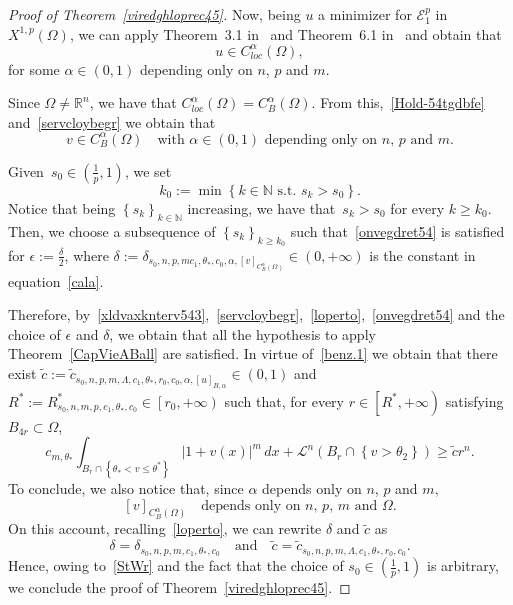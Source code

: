 \documentclass[12pt]{article}
\newcommand{\R}{\mathbb{R}}
\newcommand{\N}{\mathbb{N}}
\numberwithin{equation}{section}
\renewcommand{\leq}{\leqslant}
\renewcommand{\geq}{\geqslant}
\begin{document}
\begin{proof}[Proof of Theorem~\ref{viredghloprec45}]
Now, being $u$ a minimizer for $\mathcal{E}_1^p$  in $X^{1,p}(\Omega)$, we can apply Theorem~3.1 in~\cite{MR0666107} and Theorem~6.1 in~\cite{MR0244627} and obtain that
\begin{equation}\label{Hold-54tgdbfe}
u\in C_{\textit{loc}}^\alpha(\Omega),
\end{equation}
for some $\alpha\in (0,1)$ depending only on $n$, $p$ and $m$.

Since $\Omega\neq \R^n$, we have that $C_{\textit{loc}}^\alpha(\Omega)=C_B^\alpha(\Omega)$. From this,~\eqref{Hold-54tgdbfe} and~\eqref{servcloybegr} we obtain that 
\begin{equation}\label{loperto}
v\in C_B^\alpha(\Omega)\quad\mbox{with $\alpha\in(0,1)$ depending only on $n$, $p$ and $m$.} 
\end{equation}

Given~$s_0\in\left(\frac{1}{p},1\right)$, we set 
\begin{equation*}
k_0:=\min \left\lbrace k\in\N\mbox{  s.t.  } s_k>s_0 \right\rbrace. 
\end{equation*}
Notice that being $\left\lbrace s_k \right\rbrace_{k\in\N}$ increasing, we have that~$s_k>s_0$
for every $k\geq k_0$. 
Then, we choose a subsequence of $\left\lbrace  s_k  \right\rbrace_{k\geq k_0}$ such that~\eqref{onvegdret54} is satisfied for 
$\epsilon:=\frac{\delta}{2}$, where $\delta:=\delta_{s_0,n,p,mc_1,\theta_*,c_0,\alpha, \left[v\right]_{C_B^\alpha(\Omega)}}\in(0,+\infty)$ is the constant in equation~\eqref{cala}. 

Therefore, by~\eqref{xldvaxknterv543},~\eqref{servcloybegr},~\eqref{loperto},~\eqref{onvegdret54} and the choice of $\epsilon$ and $\delta$, we obtain that all the hypothesis to apply Theorem~\ref{CapVieABall} are satisfied. In virtue of~\eqref{benz.1} we obtain that there exist $\tilde{c}:=\tilde{c}_{s_0,n,p,m,\Lambda,c_1,\theta_*,r_0,c_0,\alpha,\left[u\right]_{B,\alpha}}\in (0,1)$ and $R^{*}:=R_{s_0,n,m,p,c_1,\theta_*,c_0}^{*}\in \left[r_0,+\infty\right)$ such that, for every $r\in \left[R^*,+\infty \right)$ satisfying $B_{4r}\subset \Omega$,
\begin{equation}\label{StWr}
c_{m,\theta_*}\int_{B_r\cap \left\lbrace\theta_*<v\leq \theta^*\right\rbrace}\left|1+v(x)\right|^m\,dx+\mathcal{L}^n(B_r\cap \left\lbrace v>\theta_2 \right\rbrace)\geq \tilde{c}r^n. 
\end{equation}
To conclude, we also notice that,
since $\alpha$ depends only on $n$, $p$ and $m$,  
\begin{equation*}
\left[v\right]_{C_B^\alpha(\Omega)}\quad\mbox{depends only on $n$, $p$, $m$ and $\Omega$}.   
\end{equation*} On this account, recalling~\eqref{loperto}, we can rewrite $\delta$ and $\tilde{c}$ as
\begin{equation*}
\delta=\delta_{s_0,n,p,m,c_1,\theta_*,c_0}\quad\mbox{and}\quad \tilde{c}=\tilde{c}_{s_0,n,p,m,\Lambda,c_1,\theta_*,r_0,c_0}.  
\end{equation*}  Hence,
owing to~\eqref{StWr} and the fact that the choice of $s_0\in \left(\frac{1}{p},1\right)$ is arbitrary, we conclude the proof of Theorem~\ref{viredghloprec45}. 
\end{proof}
\end{document}
